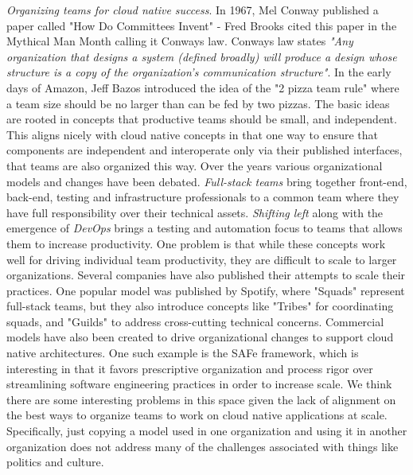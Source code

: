 \documentclass[conference]{IEEEtran}
\begin{document}
\textit{Organizing teams for cloud native success}.  In 1967, Mel Conway published a paper called "How Do Committees Invent" - Fred Brooks cited this paper in the Mythical Man Month\cite{Brooks1975} calling it Conways law\cite{ConwaysLaw}. Conways law states \textit{"Any organization that designs a system (defined broadly) will produce a design whose structure is a copy of the organization's communication structure"}.  In the early days of Amazon, Jeff Bazos introduced the idea of the "2 pizza team rule"\cite{TwoPizza} where a team size should be no larger than can be fed by two pizzas.  The basic ideas are rooted in concepts that productive teams should be small, and independent.  This aligns nicely with cloud native concepts in that one way to ensure that components are independent and interoperate only via their published interfaces, that teams are also organized this way.  Over the years various organizational models and changes have been debated. \textit{Full-stack teams} bring together front-end, back-end, testing and infrastructure professionals to a common team where they have full responsibility over their technical assets. \textit{Shifting left} along with the emergence of \textit{DevOps} brings a testing and automation focus to teams that allows them to increase productivity.  One problem is that while these concepts work well for driving individual team productivity, they are difficult to scale to larger organizations.  Several companies have also published their attempts to scale their practices.  One popular model was published by Spotify\cite{SpotifyModel}, where "Squads" represent full-stack teams, but they also introduce concepts like "Tribes" for coordinating squads, and "Guilds" to address cross-cutting technical concerns. Commercial models have also been created to drive organizational changes to support cloud native architectures.  One such example is the SAFe\cite{SAFeAgile} framework, which is interesting in that it favors prescriptive organization and process rigor over streamlining software engineering practices in order to increase scale. We think there are some interesting problems in this space given the lack of alignment on the best ways to organize teams to work on cloud native applications at scale. Specifically, just copying a model used in one organization and using it in another organization does not address many of the challenges associated with things like politics and culture. 
\end{document}
